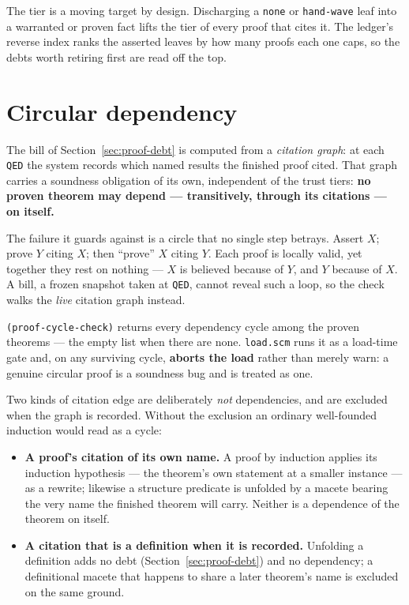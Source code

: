 \begin{remark}
The tier is a moving target by design.  Discharging a \texttt{none} or
\texttt{hand-wave} leaf into a warranted or proven fact lifts the tier of
every proof that cites it.  The ledger's reverse index ranks the asserted
leaves by how many proofs each one caps, so the debts worth retiring
first are read off the top.
\end{remark}

\section{Circular dependency}
\label{sec:proof-cycle}

The bill of Section~\ref{sec:proof-debt} is computed from a \emph{citation
graph}: at each \texttt{QED} the system records which named results the finished
proof cited.  That graph carries a soundness obligation of its own, independent
of the trust tiers: \textbf{no proven theorem may depend --- transitively,
through its citations --- on itself.}

The failure it guards against is a circle that no single step betrays.  Assert
$X$; prove $Y$ citing $X$; then ``prove'' $X$ citing $Y$.  Each proof is locally
valid, yet together they rest on nothing --- $X$ is believed because of $Y$, and
$Y$ because of $X$.  A bill, a frozen snapshot taken at \texttt{QED}, cannot
reveal such a loop, so the check walks the \emph{live} citation graph instead.

\texttt{(proof-cycle-check)} returns every dependency cycle among the proven
theorems --- the empty list when there are none.  \texttt{load.scm} runs it as a
load-time gate and, on any surviving cycle, \textbf{aborts the load} rather than
merely warn: a genuine circular proof is a soundness bug and is treated as one.

Two kinds of citation edge are deliberately \emph{not} dependencies, and are
excluded when the graph is recorded.  Without the exclusion an ordinary
well-founded induction would read as a cycle:

\begin{itemize}
\item \textbf{A proof's citation of its own name.}  A proof by induction applies
  its induction hypothesis --- the theorem's own statement at a smaller
  instance --- as a rewrite; likewise a structure predicate is unfolded by a
  macete bearing the very name the finished theorem will carry.  Neither is a
  dependence of the theorem on itself.
\item \textbf{A citation that is a definition when it is recorded.}  Unfolding a
  definition adds no debt (Section~\ref{sec:proof-debt}) and no dependency; a
  definitional macete that happens to share a later theorem's name is excluded
  on the same ground.
\end{itemize}

